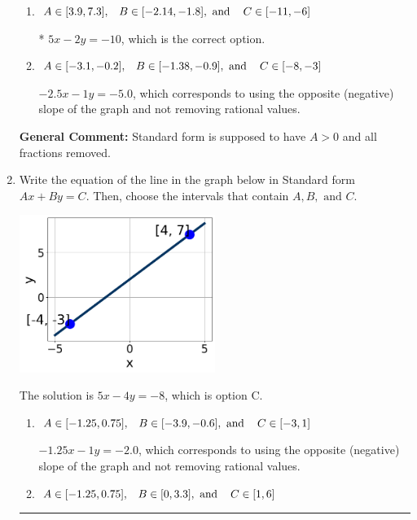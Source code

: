\documentclass{extbook}[14pt]
\newcommand{\litem}[1]{\item #1

\rule{\textwidth}{0.4pt}}
\begin{document}
\begin{enumerate}
{\begin{enumerate}[label=\Alph*.]
 $-2.5x + 1y = 5.0$, which corresponds to not removing rational values for Standard Form.
\item \( A \in [3.9, 7.3], \hspace{3mm} B \in [-2.14, -1.8], \text{ and } \hspace{3mm} C \in [-11, -6] \)

* $5x - 2y = -10$, which is the correct option.
\item \( A \in [-3.1, -0.2], \hspace{3mm} B \in [-1.38, -0.9], \text{ and } \hspace{3mm} C \in [-8, -3] \)

 $-2.5x - 1y = -5.0$, which corresponds to using the opposite (negative) slope of the graph and not removing rational values.
\end{enumerate}

\textbf{General Comment:} Standard form is supposed to have $A > 0$ and all fractions removed.
}
\litem{
Write the equation of the line in the graph below in Standard form $Ax+By=C$. Then, choose the intervals that contain $A, B, \text{ and } C$.

\begin{center}
    \includegraphics[width=0.5\textwidth]{../Figures/linearGraphToStandardA.png}
\end{center}


The solution is \( 5x - 4y = -8 \), which is option C.\begin{enumerate}[label=\Alph*.]
\item \( A \in [-1.25, 0.75], \hspace{3mm} B \in [-3.9, -0.6], \text{ and } \hspace{3mm} C \in [-3, 1] \)

 $-1.25x - 1y = -2.0$, which corresponds to using the opposite (negative) slope of the graph and not removing rational values.
\item \( A \in [-1.25, 0.75], \hspace{3mm} B \in [0, 3.3], \text{ and } \hspace{3mm} C \in [1, 6] \)


\end{enumerate}}
\end{enumerate}
\end{document}
